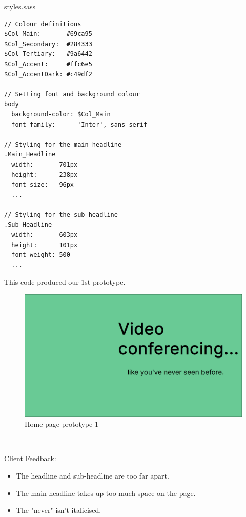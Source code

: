 \underline{styles.sass}

\begin{verbatim}
// Colour definitions
$Col_Main:       #69ca95
$Col_Secondary:  #284333
$Col_Tertiary:   #9a6442
$Col_Accent:     #ffc6e5
$Col_AccentDark: #c49df2

// Setting font and background colour
body
  background-color: $Col_Main
  font-family:      'Inter', sans-serif

// Styling for the main headline
.Main_Headline
  width:       701px
  height:      238px
  font-size:   96px
  ... 

// Styling for the sub headline
.Sub_Headline
  width:       603px
  height:      101px
  font-weight: 500
  ...
\end{verbatim}

This code produced our 1st prototype.

\begin{figure}[H]
\centering

\includegraphics[scale=0.2]{Images/Proto_home1.png}

\caption{Home page prototype 1}
\end{figure}

{\color{gray} \hrulefill} \\ \vspace{0.2cm}

{\sffamily Client Feedback:} 
\begin{itemize}
  \item The headline and sub-headline are too far apart.
  \item The main headline takes up too much space on the page.
  \item The "never" isn't italicised.
\end{itemize}

